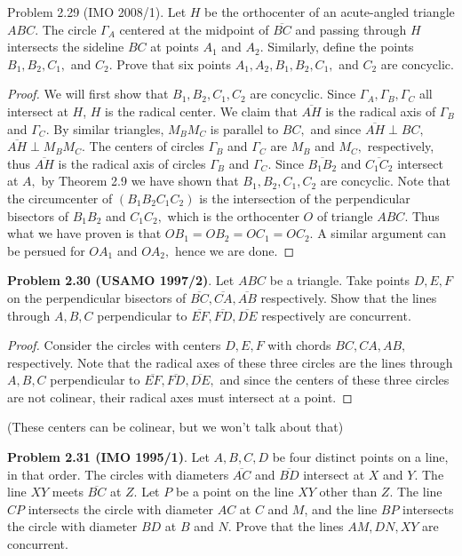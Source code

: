 \documentclass[letterpaper,oneside]{book}
\begin{document}
  

  Problem 2.29 (IMO 2008/1)\textbf{}.   Let $H$ be the orthocenter of an acute-angled triangle $ABC.$ The circle $\Gamma_A$ centered at the midpoint of $\overline{BC}$ and passing through $H$ intersects the sideline $BC$ at points $A_1$ and $A_2.$ Similarly, define the points $B_1, B_2, C_1,$ and $C_2.$ Prove that six points $A_1, A_2, B_1, B_2, C_1,$ and $C_2$ are concyclic.

  \begin{proof}  We will first show that $B_1, B_2, C_1, C_2$ are concyclic. Since $\Gamma_A,\Gamma_B, \Gamma_C$ all intersect at $H$, $H$ is the radical center. We claim that $\overline{AH}$ is the radical axis of $\Gamma_B$ and $\Gamma_C.$ By similar triangles, $M_BM_C$ is parallel to $BC,$ and since $\overline{AH} \perp BC,$ $\overline{AH} \perp M_BM_C.$ The centers of circles $\Gamma_B$ and $\Gamma_C$ are $M_B$ and $M_C,$ respectively, thus $\overline{AH}$ is the radical axis of circles $\Gamma_B$ and $\Gamma_C.$ Since $\overline{B_1B_2}$ and $\overline{C_1C_2}$ intersect at $A,$ by Theorem 2.9 we have shown that $B_1, B_2,C_1,C_2$ are concyclic. Note that the circumcenter of $(B_1B_2C_1C_2)$ is the intersection of the perpendicular bisectors of $B_1B_2$ and $C_1C_2,$ which is the orthocenter $O$ of triangle $ABC.$ Thus what we have proven is that $OB_1 = OB_2 = OC_1 = OC_2.$ A similar argument can be persued for $OA_1$ and $OA_2,$ hence we are done. \end{proof}

  

  \textbf{Problem 2.30 (USAMO 1997/2)}.   Let $ABC$ be a triangle. Take points $D, E, F$ on the perpendicular bisectors of $\overline{BC}, \overline{CA}, \overline{AB}$ respectively. Show that the lines through $A, B, C$  perpendicular to $\overline{EF}, \overline{FD}, \overline{DE}$ respectively are concurrent.

  \begin{proof}  Consider the circles with centers $D,E,F$ with chords $BC, CA, AB,$ respectively. Note that the radical axes of these three circles are the lines through $A,B,C$ perpendicular to $\overline{EF}, \overline{FD}, \overline{DE},$ and since the centers of these three circles are not colinear, their radical axes must intersect at a point. \end{proof} (These centers  can  be colinear, but we won't talk about that)

  

  \textbf{Problem 2.31 (IMO 1995/1)}.   Let  $A, B, C, D$ be four distinct points on a line, in that order. The circles with diameters $\overline{AC}$ and $\overline{BD}$ intersect at $X$ and $Y.$ The line $XY$ meets $\overline{BC}$ at $Z.$ Let $P$ be a point on the line $XY$ other than $Z$. The line $CP$ intersects the circle with diameter $AC$ at $C$ and $M$, and the line $BP$ intersects the circle with diameter $BD$ at $B$ and $N$. Prove that the lines $AM, DN, XY$ are concurrent.
\end{document}

